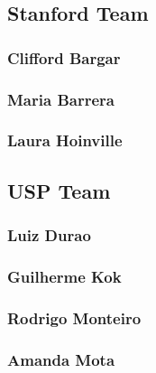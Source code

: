 \subsection{Stanford Team}

\subsubsection{Clifford Bargar}

\subsubsection{Maria Barrera}

\subsubsection{Laura Hoinville}

\subsection{USP Team}

\subsubsection{Luiz Durao}

\subsubsection{Guilherme Kok}

\subsubsection{Rodrigo Monteiro}

\subsubsection{Amanda Mota}

